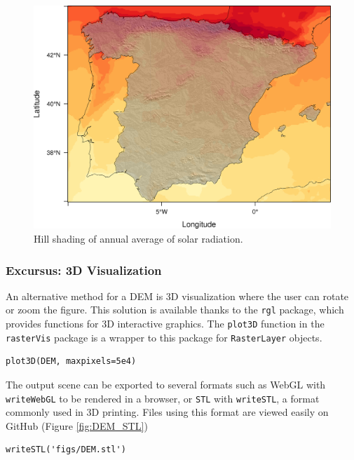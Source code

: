 \documentclass[smallroyalvopaper]{memoir}
\begin{document}
\begin{figure}[htb]
\centering
\includegraphics[width=.9\linewidth]{figs/hillShading.png}
\caption{\label{fig:hillShading}Hill shading of annual average of solar radiation.}
\end{figure}
\subsubsection{Excursus: 3D Visualization}
\label{sec-1-1-2}
An alternative method for a DEM is 3D visualization where the user can
rotate or zoom the figure. This solution is available thanks to the
\texttt{rgl} package, which provides functions for 3D interactive
graphics. The \texttt{plot3D} function in the \texttt{rasterVis} package is a
wrapper to this package for \texttt{RasterLayer} objects.


\lstset{language=R,numbers=none}
\begin{lstlisting}
plot3D(DEM, maxpixels=5e4)
\end{lstlisting}

The output scene can be exported to several formats such as WebGL with
\texttt{writeWebGL} to be rendered in a browser, or \texttt{STL} with \texttt{writeSTL}, a
format commonly used in 3D printing. Files using this format are
viewed easily on GitHub (Figure \ref{fig:DEM_STL})

\lstset{language=R,numbers=none}
\begin{lstlisting}
writeSTL('figs/DEM.stl')
\end{lstlisting}
\end{document}
